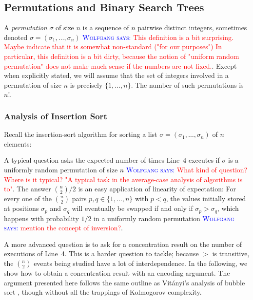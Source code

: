 \documentclass{patmorin}
\newcommand{\aremark}[3]{\textcolor{blue}{\textsc{#1 #2:}}
  \textcolor{red}{\textsf{#3}}}
\newcommand{\wolfgang}[2][says]{\aremark{Wolfgang}{#1}{#2}}
\begin{document}
\subsection{Permutations and Binary Search Trees}

A \emph{permutation} $\sigma$ of size $n$ is a sequence of $n$
pairwise distinct integers, sometimes denoted
$\sigma = (\sigma_1, \ldots, \sigma_n)$
\wolfgang{This definition is a bit surprising. Maybe indicate
that it is somewhat non-standard ("for our purposes")
In particular, this definition is a bit dirty, because
the notion of "uniform random permutation" does not make
much sense if the numbers are not fixed.}. 
Except when explicitly
stated, we will assume that the set of integers involved in a
permutation of size $n$ is precisely $\{1, \ldots, n\}$. The number of
such permutations is $n!$.

\subsubsection{Analysis of Insertion Sort}

Recall the insertion-sort algorithm for sorting a list
$\sigma = (\sigma_1,\ldots,\sigma_n)$ of $n$ elements:

\begin{algorithmic}[1]
     \ENDWHILE
  \ENDFOR
\end{algorithmic}

A typical question asks the expected number of times Line~4 executes
if $\sigma$ is a uniformly random permutation of size $n$
\wolfgang{What kind of question? Where is it typical?
"A typical task in the average-case analysis of algorithms is to"}.  
The answer
$\binom{n}{2}/2$ is an easy application of linearity of expectation:
For every one of the $\binom{n}{2}$ pairs $p,q\in\{1,\ldots,n\}$ with
$p<q$, the values initially stored at positions $\sigma_p$ and
$\sigma_q$ will eventually be swapped if and only if
$\sigma_p > \sigma_q$, which happens with probability $1/2$ in a
uniformly random permutation \wolfgang{mention the
concept of inversion?}.

A more advanced question is to ask for a concentration result on the
number of executions of Line~4. This is a harder question to tackle;
because $>$ is transitive, the $\binom{n}{2}$ events being studied
have a lot of interdependence. In the following, we show how to obtain
a concentration result with an encoding argument.  The argument
presented here follows the same outline as Vit\'{a}nyi's analysis of
bubble sort \cite{vitanyi:analysis}, though without all the trappings
of Kolmogorov complexity.
\end{document}
